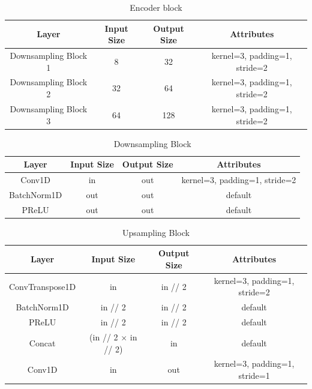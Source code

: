 \documentclass[sigconf]{acmart}
\begin{document}
\begin{table}
  \centering
  \caption{Encoder block}
  \begin{tabular}{c c c c}
    \hline\hline
    Layer & Input Size & Output Size & Attributes \\
    \hline
    Downsampling Block 1 & 8 & 32 & kernel=3, padding=1, stride=2 \\
    Downsampling Block 2 & 32 & 64 & kernel=3, padding=1, stride=2 \\
    Downsampling Block 3 & 64 & 128 & kernel=3, padding=1, stride=2 \\
  \end{tabular}
  \label{tab:encoder}
\end{table}

\begin{table}
  \centering
  \caption{Downsampling Block}

  \begin{tabular}{c c c c}
    \hline\hline
    Layer & Input Size & Output Size & Attributes \\
    \hline
    Conv1D & in & out & kernel=3, padding=1, stride=2 \\
    BatchNorm1D & out & out & default \\
    PReLU & out & out & default 

  \end{tabular}
  \label{tab:downblock}
\end{table}

\begin{table}
  \centering
  \caption{Upsampling Block}

  \begin{tabular}{c c c c}
    \hline\hline
    Layer & Input Size & Output Size & Attributes \\
    \hline
    ConvTranspose1D & in & in // 2 & kernel=3, padding=1, stride=2 \\
    BatchNorm1D & in // 2 & in // 2 & default \\
    PReLU & in // 2 & in // 2 & default \\
    Concat & (in // 2 $\times$ in // 2) & in & default \\
    Conv1D & in & out & kernel=3, padding=1, stride=1

  \end{tabular}
  \label{tab:upblock}
\end{table}
\end{document}
